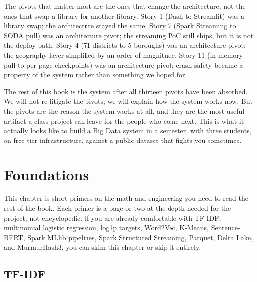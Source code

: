 \documentclass[11pt,letterpaper]{book}
\begin{document}
The pivots that matter most are the ones that change the architecture, not the ones that swap a library for another library. Story 1 (Dash to Streamlit) was a library swap; the architecture stayed the same. Story 7 (Spark Streaming to SODA pull) was an architecture pivot; the streaming PoC still ships, but it is not the deploy path. Story 4 (71 districts to 5 boroughs) was an architecture pivot; the geography layer simplified by an order of magnitude. Story 11 (in-memory pull to per-page checkpoints) was an architecture pivot; crash safety became a property of the system rather than something we hoped for.

The rest of this book is the system after all thirteen pivots have been absorbed. We will not re-litigate the pivots; we will explain how the system works now. But the pivots are the reason the system works at all, and they are the most useful artifact a class project can leave for the people who come next. This is what it actually looks like to build a Big Data system in a semester, with three students, on free-tier infrastructure, against a public dataset that fights you sometimes.


\chapter{Foundations}
\label{ch:foundations}

This chapter is short primers on the math and engineering you need to read the rest of the book. Each primer is a page or two at the depth needed for the project, not encyclopedic. If you are already comfortable with TF-IDF, multinomial logistic regression, log1p targets, Word2Vec, K-Means, Sentence-BERT, Spark MLlib pipelines, Spark Structured Streaming, Parquet, Delta Lake, and MurmurHash3, you can skim this chapter or skip it entirely.

\section{TF-IDF}
\end{document}
